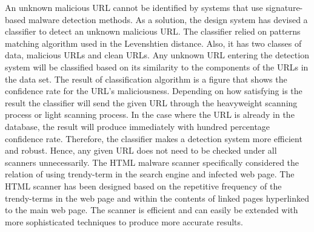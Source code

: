 An unknown malicious URL cannot be identified by systems that use signature-based malware detection methods. As a solution, the design system has devised a classifier to detect an unknown malicious URL. The classifier relied on patterns matching algorithm used in the Levenshtien distance. Also, it has two classes of data, malicious URLs and clean URLs. Any unknown URL entering the detection system will be classified based on its similarity to the components of the URLs in the data set. The result of classification algorithm is a figure that shows the confidence rate for the URL’s maliciousness. Depending on how satisfying is the result the classifier will send the given URL through the heavyweight scanning process or light scanning process. In the case where the URL is already in the database, the result will produce immediately with hundred percentage confidence rate. Therefore, the classifier makes a detection system more efficient and robust. Hence, any given URL does not need to be checked under all scanners unnecessarily.    
The HTML malware scanner specifically considered the relation of using trendy-term in the search engine and infected web page. The HTML scanner has been designed based on the repetitive frequency of the trendy-terms in the web page and within the contents of linked pages hyperlinked to the main web page. The scanner is efficient and can easily be extended with more sophisticated techniques to produce more accurate results. 
